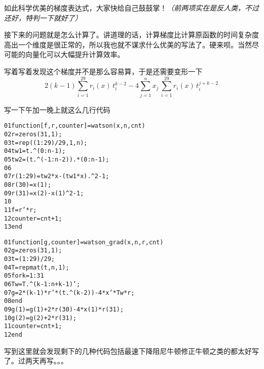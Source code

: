 \documentclass[a4paper, 11pt]{article}
\begin{document}
如此科学优美的梯度表达式，大家快给自己鼓鼓掌！\textsl{（前两项实在是反人类，不过还好，特判一下就好了）}

接下来的问题就是怎么计算了。讲道理的话，计算梯度比计算原函数的时间复杂度高出一个维度是很正常的，所以我也就不谋求什么优美的写法了。硬来呗。当然尽可能的向量化可以大幅提升计算效率。

写着写着发现这个梯度并不是那么容易算，于是还需要变形一下
\[2(k-1)\sum_{i=1}^{29}r_i(x)\,t_i^{k-2}-4\sum_{j=1}^nx_j\,\sum_{i=1}^{29}r_i(x)\,t_i^{j+k-2}\]

写一下午加一晚上就这么几行代码

\begin{alltt}
01 \textcolor{keyword}{function} [f, r, counter] = watson(x, n, cnt)
02     r = zeros(31, 1);
03     t = rep((1:29) / 29, 1, n);
04     tw1 = t .\^{} (0:n-1);
05     tw2 = (t .\^{} (-1:n-2)) .* (0:n-1);
06     
07     r(1:29) = tw2 * x - (tw1 * x) .\^{} 2 - 1;
08     r(30) = x(1);
09     r(31) = x(2) - x(1) \^{} 2 - 1;
10     
11     f = r' * r;
12     counter = cnt + 1;
13 \textcolor{keyword}{end}
\end{alltt}

\begin{alltt}
01 \textcolor{keyword}{function} [g, counter] = watson\_grad(x, n, r, cnt)
02     g = zeros(31, 1);
03     t = (1:29) / 29;
04     T = repmat(t, n, 1);
05     \textcolor{keyword}{for} k = 1:31
06         Tw = T .\^{} (k-1:n+k-1)';
07         g = 2 * (k - 1) * r' * (t .\^{} (k - 2)) - 4 * x' * Tw * r;
08     \textcolor{keyword}{end}
09     g(1) = g(1) + 2 * r(30) - 4 * x(1) * r(31);
10     g(2) = g(2) + 2 * r(31);
11     counter = cnt + 1;
12 \textcolor{keyword}{end}
\end{alltt}

写到这里就会发现剩下的几种代码包括最速下降阻尼牛顿修正牛顿之类的都太好写了。过两天再写。。。

\newpage


\end{document}
